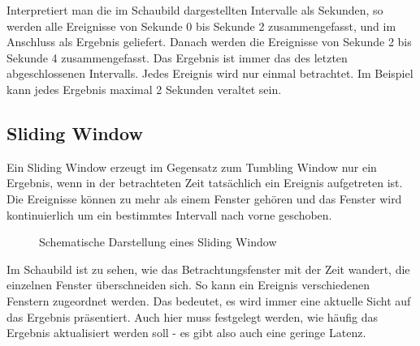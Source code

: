 \documentclass[a4paper,11pt]{scrartcl}
\begin{document}
  Interpretiert man die im Schaubild dargestellten Intervalle als Sekunden, so
  werden alle Ereignisse von Sekunde 0 bis Sekunde 2 zusammengefasst, und im
  Anschluss als Ergebnis geliefert. Danach werden die Ereignisse von Sekunde 2
  bis Sekunde 4 zusammengefasst. Das Ergebnis ist immer das des letzten
  abgeschlossenen Intervalls. Jedes Ereignis wird nur einmal betrachtet. Im
  Beispiel kann jedes Ergebnis maximal 2 Sekunden veraltet sein.

  \subsection{Sliding Window}
  Ein Sliding Window erzeugt im Gegensatz zum Tumbling Window nur ein Ergebnis,
  wenn in der betrachteten Zeit tatsächlich ein Ereignis aufgetreten ist. Die
  Ereignisse können zu mehr als einem Fenster gehören und das Fenster wird
  kontinuierlich um ein bestimmtes Intervall nach vorne
  geschoben.\cite[S.~472]{kleppmann17}
  \begin{figure}[!h]
    \centering
    \caption{Schematische Darstellung eines Sliding Window}
  \end{figure}

  Im Schaubild ist zu sehen, wie das Betrachtungsfenster mit der Zeit
  wandert, die einzelnen Fenster überschneiden sich. So kann ein
  Ereignis verschiedenen Fenstern zugeordnet werden. Das bedeutet, es
  wird immer eine aktuelle Sicht auf das Ergebnis präsentiert. Auch
  hier muss festgelegt werden, wie häufig das Ergebnis aktualisiert
  werden soll - es gibt also auch eine geringe Latenz.


\end{document}
